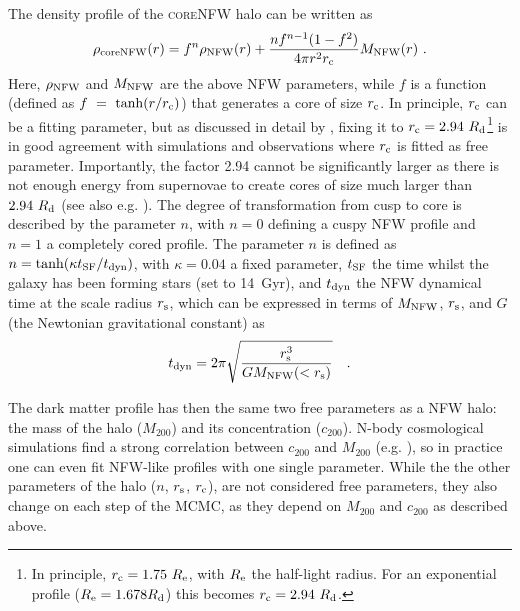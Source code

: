 \documentclass[fleqn,usenatbib]{mnras}
\begin{document}
The density profile of the \textsc{core}NFW halo can be written as
\begin{equation}
    \rho_{\rm coreNFW}(r) = f^n \rho_{\rm NFW}(r) + \dfrac{nf^{n-1}(1-f^2)}{4\pi r^2 r_{\rm c}} M_{\rm NFW}(r)~.
\end{equation}
Here, $\rho_{\rm NFW}$ and $M_{\rm NFW}$ are the above NFW parameters, while $f$ is a function (defined as $f~=~\tanh(r/r_{\rm c})$) that generates a core of size $r_{\rm c}$. In principle, $r_{\rm c}$ can be a fitting parameter, but as discussed in detail by \citet{coreNFW,readAD,read2017}, fixing it to $r_{\rm c} = 2.94~R_{\rm d}$\footnote{In principle, $r_{\rm c} = 1.75~R_{\rm e}$, with $R_{\rm e}$ the half-light radius. For an exponential profile ($R_{\rm e} = 1.678 R_{\rm d}$) this becomes $r_{\rm c} = 2.94~R_{\rm d}$.} is in good agreement with simulations and observations where $r_{\rm c}$ is fitted as free parameter. Importantly, the factor 2.94 cannot be significantly larger as there is not enough energy from supernovae to create cores of size much larger than $2.94~R_{\rm d}$ (see also e.g. \citealt{benitezllambay19,coreEinasto,trujillogomez_udgs}). The degree of transformation from cusp to core is described by the parameter $n$, with $n=0$ defining a cuspy NFW profile and $n = 1$ a completely cored profile. The parameter $n$ is defined as $n = \tanh(\kappa t_{\rm SF} / t_{\rm dyn})$, with $\kappa = 0.04$ a fixed parameter, $t_{\rm SF}$ the time whilst the galaxy has been forming stars (set to 14~Gyr), and $t_{\rm dyn}$ the NFW dynamical time at the scale radius $r_{\rm s}$, which can be expressed in terms of $M_{\rm NFW}$, $r_{\rm s}$, and $G$ (the Newtonian gravitational constant) as 
\begin{equation}
\label{eq:tdyn}
    t_{\rm dyn} = 2 \pi \sqrt{\dfrac{r_{\rm s}^3}{G M_{\rm NFW}(<r_{\rm s})}} ~~~.
\end{equation}


The dark matter profile has then the same two free parameters as a NFW halo: the mass of the halo ($M_{200}$) and its concentration ($c_{200}$). N-body cosmological simulations find a strong correlation between $c_{200}$ and $M_{200}$ (e.g. \citealt{duttonmaccio2014,ludlow2014}), so in practice one can even fit NFW-like profiles with one single parameter. While the the other parameters of the halo ($n$, $r_{\rm s}$, $r_{\rm c}$), are not considered free parameters, they also change on each step of the MCMC, as they depend on $M_{200}$ and $c_{200}$ as described above. %
\end{document}
